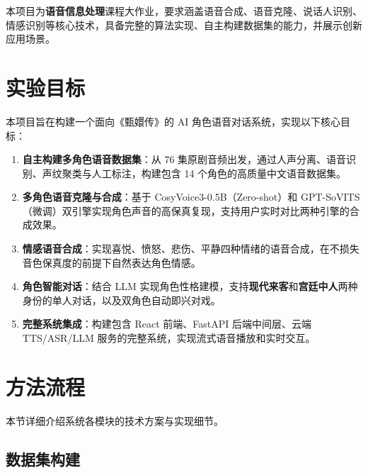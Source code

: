 \documentclass[12pt,a4paper]{article}
\begin{document}
本项目为\textbf{语音信息处理}课程大作业，要求涵盖语音合成、语音克隆、说话人识别、情感识别等核心技术，具备完整的算法实现、自主构建数据集的能力，并展示创新应用场景。

\section{实验目标}
\label{sec:objectives}

本项目旨在构建一个面向《甄嬛传》的 AI 角色语音对话系统，实现以下核心目标：

\begin{enumerate}[leftmargin=2em]
    \item \textbf{自主构建多角色语音数据集}：从 76 集原剧音频出发，通过人声分离、语音识别、声纹聚类与人工标注，构建包含 14 个角色的高质量中文语音数据集。
    \item \textbf{多角色语音克隆与合成}：基于 CosyVoice3-0.5B（Zero-shot）和 GPT-SoVITS（微调）双引擎实现角色声音的高保真复现，支持用户实时对比两种引擎的合成效果。
    \item \textbf{情感语音合成}：实现喜悦、愤怒、悲伤、平静四种情绪的语音合成，在不损失音色保真度的前提下自然表达角色情感。
    \item \textbf{角色智能对话}：结合 LLM 实现角色性格建模，支持\textbf{现代来客}和\textbf{宫廷中人}两种身份的单人对话，以及双角色自动即兴对戏。
    \item \textbf{完整系统集成}：构建包含 React 前端、FastAPI 后端中间层、云端 TTS/ASR/LLM 服务的完整系统，实现流式语音播放和实时交互。
\end{enumerate}

\section{方法流程}
\label{sec:methods}

本节详细介绍系统各模块的技术方案与实现细节。


\subsection{数据集构建}
\label{sec:data}
\end{document}
